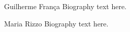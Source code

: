 \documentclass[10pt,journal,compsoc]{IEEEtran}
\begin{document}
\ifCLASSOPTIONcaptionsoff
  \newpage
\fi





%
%
%



%



% 

\begin{IEEEbiography}{Guilherme Fran\c ca}
Biography text here.
\end{IEEEbiography}

\begin{IEEEbiographynophoto}{Maria Rizzo}
Biography text here.
\end{IEEEbiographynophoto}

\end{document}
